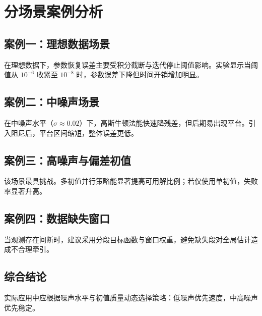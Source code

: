 \chapter{分场景案例分析}

\section{案例一：理想数据场景}
在理想数据下，参数恢复误差主要受积分截断与迭代停止阈值影响。实验显示当阈值从 $10^{-6}$ 收紧至 $10^{-8}$ 时，参数误差下降但时间开销增加明显。

\section{案例二：中噪声场景}
在中噪声水平（$\sigma\approx0.02$）下，高斯牛顿法能快速降残差，但后期易出现平台。引入阻尼后，平台区间缩短，整体误差更低。

\section{案例三：高噪声与偏差初值}
该场景最具挑战。多初值并行策略能显著提高可用解比例；若仅使用单初值，失败率显著升高。

\section{案例四：数据缺失窗口}
当观测存在间断时，建议采用分段目标函数与窗口权重，避免缺失段对全局估计造成不合理牵引。

\section{综合结论}
实际应用中应根据噪声水平与初值质量动态选择策略：低噪声优先速度，中高噪声优先稳定。
